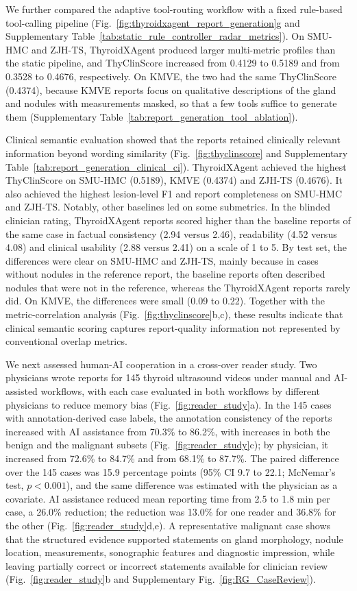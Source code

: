 \documentclass[fleqn,10pt]{wlscirep}
\begin{document}
We further compared the adaptive tool-routing workflow with a fixed rule-based tool-calling pipeline (Fig.~\ref{fig:thyroidxagent_report_generation}g and Supplementary Table~\ref{tab:static_rule_controller_radar_metrics}). On SMU-HMC and ZJH-TS, ThyroidXAgent produced larger multi-metric profiles than the static pipeline, and ThyClinScore increased from 0.4129 to 0.5189 and from 0.3528 to 0.4676, respectively. On KMVE, the two had the same ThyClinScore (0.4374), because KMVE reports focus on qualitative descriptions of the gland and nodules with measurements masked, so that a few tools suffice to generate them (Supplementary Table~\ref{tab:report_generation_tool_ablation}).

Clinical semantic evaluation showed that the reports retained clinically relevant information beyond wording similarity (Fig.~\ref{fig:thyclinscore} and Supplementary Table~\ref{tab:report_generation_clinical_ci}). ThyroidXAgent achieved the highest ThyClinScore on SMU-HMC (0.5189), KMVE (0.4374) and ZJH-TS (0.4676). It also achieved the highest lesion-level F1 and report completeness on SMU-HMC and ZJH-TS. Notably, other baselines led on some submetrics. In the blinded clinician rating, ThyroidXAgent reports scored higher than the baseline reports of the same case in factual consistency (2.94 versus 2.46), readability (4.52 versus 4.08) and clinical usability (2.88 versus 2.41) on a scale of 1 to 5. By test set, the differences were clear on SMU-HMC and ZJH-TS, mainly because in cases without nodules in the reference report, the baseline reports often described nodules that were not in the reference, whereas the ThyroidXAgent reports rarely did. On KMVE, the differences were small (0.09 to 0.22). Together with the metric-correlation analysis (Fig.~\ref{fig:thyclinscore}b,c), these results indicate that clinical semantic scoring captures report-quality information not represented by conventional overlap metrics.

We next assessed human-AI cooperation in a cross-over reader study. Two physicians wrote reports for 145 thyroid ultrasound videos under manual and AI-assisted workflows, with each case evaluated in both workflows by different physicians to reduce memory bias (Fig.~\ref{fig:reader_study}a). In the 145 cases with annotation-derived case labels, the annotation consistency of the reports increased with AI assistance from 70.3\% to 86.2\%, with increases in both the benign and the malignant subsets (Fig.~\ref{fig:reader_study}c); by physician, it increased from 72.6\% to 84.7\% and from 68.1\% to 87.7\%. The paired difference over the 145 cases was 15.9 percentage points (95\% CI 9.7 to 22.1; McNemar's test, \(p<0.001\)), and the same difference was estimated with the physician as a covariate. AI assistance reduced mean reporting time from 2.5 to 1.8 min per case, a 26.0\% reduction; the reduction was 13.0\% for one reader and 36.8\% for the other (Fig.~\ref{fig:reader_study}d,e). A representative malignant case shows that the structured evidence supported statements on gland morphology, nodule location, measurements, sonographic features and diagnostic impression, while leaving partially correct or incorrect statements available for clinician review (Fig.~\ref{fig:reader_study}b and Supplementary Fig.~\ref{fig:RG_CaseReview}).
\end{document}
